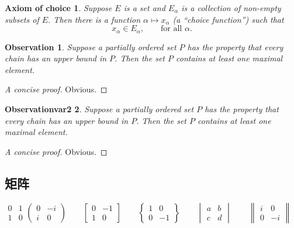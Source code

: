 \newtheorem*{axiomofchoice}{Axiom of choice}
\begin{axiomofchoice}
	Suppose $E$ is a set and ${E_\alpha}$ is a collection of
	non-empty subsets of $E$. Then there is a function $\alpha
	\mapsto x_\alpha$ (a ``choice function'') such that
	\begin{equation}
	x_\alpha \in E_\alpha,\qquad \text{for all }\alpha.
	\end{equation}
\end{axiomofchoice}

\newtheorem{observation}{Observation}[chapter]
\begin{observation}
	Suppose a partially ordered set $P$ has the property
	that every chain has an upper bound in $P$. Then the
	set $P$ contains at least one maximal element.
\end{observation}
\begin{proof}[A concise proof]
	Obvious.
\end{proof}

\newtheorem{observationvar2}[observation]{Observationvar2}
\begin{observationvar2}
	Suppose a partially ordered set $P$ has the property
	that every chain has an upper bound in $P$. Then the
	set $P$ contains at least one maximal element.
\end{observationvar2}
\begin{proof}[A concise proof]
	Obvious.
\end{proof}

\newpage

\subsection{矩阵}

	\[
	\begin{matrix}
	0 & 1 \\
	1 & 0
	\end{matrix}
	\begin{pmatrix}
	0 & -i \\
	i & 0
	\end{pmatrix} \qquad
	\begin{bmatrix}
	0 & -1 \\
	1 & 0
	\end{bmatrix} \qquad
	\begin{Bmatrix}
	1 & 0 \\
	0 & -1
	\end{Bmatrix} \qquad
	\begin{vmatrix}
	a & b \\
	c & d
	\end{vmatrix} \qquad
	\begin{Vmatrix}
	i & 0 \\
	0 & -i
	\end{Vmatrix} \qquad
	\]
	
